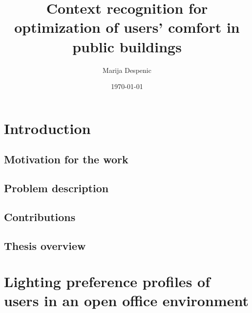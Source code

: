 \documentclass[a4paper]{article}
\title{\textbf{Context recognition for optimization of users' comfort in public buildings}}
\author{Marija Despenic}
\date{\today}
\begin{document}
\maketitle

\newpage


\section {Introduction}

\subsection {Motivation for the work}		

\subsection {Problem description}

\subsection{Contributions}

\subsection{Thesis overview}

\section{Lighting preference profiles of users in an open office environment}\label{sec:PrefProfiles}
\end{document}
